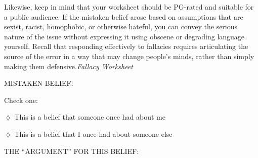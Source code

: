 \documentclass[oneside, openany]{book} %
\begin{document}
\noindent Likewise, keep in mind that your worksheet should be PG-rated and suitable for a public audience. If the mistaken belief arose based on assumptions that are sexist, racist, 
homophobic, or otherwise hateful, you can convey the serious nature of the issue without expressing it using obscene or degrading language yourself. Recall that responding effectively to 
fallacies requires articulating the source of the error in a way that may change people's minds, rather than simply making them defensive.\textit{Fallacy Worksheet}

\noindent

\noindent

\noindent

\noindent

\noindent MISTAKEN BELIEF:

\noindent

\noindent

\noindent

\noindent

\noindent Check one:

\noindent

\noindent $\mathrm{\lozenge}$ This is a belief that someone once had about me

\noindent

\noindent $\mathrm{\lozenge}$ This is a belief that I once had about someone else

\noindent 

\noindent 

\noindent 

\noindent 

\noindent THE ``ARGUMENT'' FOR THIS BELIEF:

\noindent 

\noindent 

\noindent 

\noindent 

\noindent 

\noindent 

\noindent 

\noindent 

\noindent 

\noindent 

\noindent 

\noindent 

\noindent 

\noindent 

\noindent 

\noindent 

\noindent 
\end{document}
